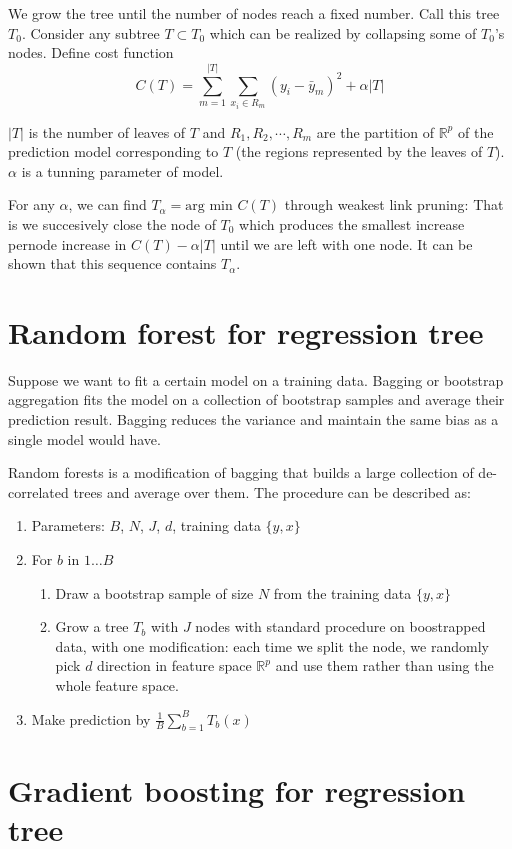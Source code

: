 \documentclass{article}
\begin{document}
We grow the tree until the number of nodes reach a fixed number. Call this tree $T_0$. Consider any subtree $T \subset T_0$ which can be realized by collapsing some of $T_0$'s nodes. Define cost function
\[
C(T)=\sum_{m=1}^{|T|}\sum_{x_i\in R_m}(y_i-\bar{y}_m)^2+\alpha|T|
\]

$|T|$ is the number of leaves of $T$ and $R_1, R_2,\cdots, R_m$ are the partition of $\mathbb{R}^p$ of the prediction model corresponding to $T$ (the regions represented by the leaves of $T$). $\alpha$ is a tunning parameter of model. 

For any $\alpha$, we can find $T_\alpha=\textrm{arg min }C(T)$ through weakest link pruning: That is we succesively close the node of $T_0$ which produces the smallest increase pernode increase in $C(T)-\alpha|T|$ until we are left with one node. It can be shown that this sequence contains $T_\alpha$.
\section{Random forest for regression tree}
Suppose we want to fit a certain model on a training data. Bagging or bootstrap aggregation fits the model on a collection of bootstrap samples and average their prediction result. Bagging reduces the variance and maintain the same bias as a single model would have.

Random forests is a modification of bagging that builds a large collection of de-correlated trees and average over them. The procedure can be described as:

\begin{enumerate}
\item
Parameters: $B$, $N$, $J$, $d$, training data $\{y,x\}$
\item
For $b$ in $1\dots B$
\begin{enumerate}
\item
Draw a bootstrap sample of size $N$ from the training data $\{y,x\}$
\item
Grow a tree $T_b$ with $J$ nodes with standard procedure on boostrapped data, with one modification: each time we split the node, we randomly pick $d$ direction in feature space $\mathbb{R}^p$ and use them rather than using the whole feature space. 
\end{enumerate}
\item
Make prediction by $\frac{1}{B}\sum_{b=1}^BT_b(x)$
\end{enumerate}

\section{Gradient boosting for regression tree}
\end{document}

